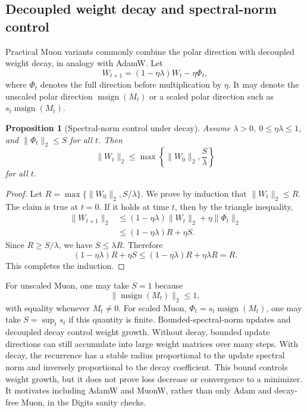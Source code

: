 \documentclass[sigconf,nonacm]{acmart}
\newtheorem{proposition}{Proposition}
\begin{document}
\subsection{Decoupled weight decay and spectral-norm control}
Practical Muon variants commonly combine the polar direction with decoupled weight decay, in analogy with AdamW. Let
\begin{equation}
  W_{t+1}=(1-\eta\lambda)W_t-\eta\Phi_t,
\end{equation}
where $\Phi_t$ denotes the full direction before multiplication by $\eta$. It may denote the unscaled polar direction $\operatorname{msign}(M_t)$ or a scaled polar direction such as $s_t\operatorname{msign}(M_t)$.

\begin{proposition}[Spectral-norm control under decay]\label{prop:decay}
Assume $\lambda>0$, $0\leq \eta\lambda\leq1$, and $\|\Phi_t\|_2\leq S$ for all $t$. Then
\begin{equation}
  \|W_t\|_2\leq \max\left\{\|W_0\|_2,\frac{S}{\lambda}\right\}
\end{equation}
for all $t$.
\end{proposition}

\begin{proof}
Let $R=\max\{\|W_0\|_2,S/\lambda\}$. We prove by induction that $\|W_t\|_2\leq R$. The claim is true at $t=0$. If it holds at time $t$, then by the triangle inequality,
\begin{align}
\|W_{t+1}\|_2
&\leq (1-\eta\lambda)\|W_t\|_2+\eta\|\Phi_t\|_2\\
&\leq (1-\eta\lambda)R+\eta S.
\end{align}
Since $R\geq S/\lambda$, we have $S\leq\lambda R$. Therefore
\begin{equation}
(1-\eta\lambda)R+\eta S\leq (1-\eta\lambda)R+\eta\lambda R=R.
\end{equation}
This completes the induction.
\end{proof}

For unscaled Muon, one may take $S=1$ because
\begin{equation}
  \|\operatorname{msign}(M_t)\|_2\leq1,
\end{equation}
with equality whenever $M_t\neq0$. For scaled Muon,
$\Phi_t=s_t\operatorname{msign}(M_t)$, one may take
$S=\sup_t s_t$ if this quantity is finite. Bounded-spectral-norm updates and decoupled decay control weight growth. Without decay, bounded update directions can still accumulate into large weight matrices over many steps. With decay, the recurrence has a stable radius proportional to the update spectral norm and inversely proportional to the decay coefficient. This bound controls weight growth, but it does not prove loss decrease or convergence to a minimizer. It motivates including AdamW and MuonW, rather than only Adam and decay-free Muon, in the Digits sanity checks.
\end{document}

